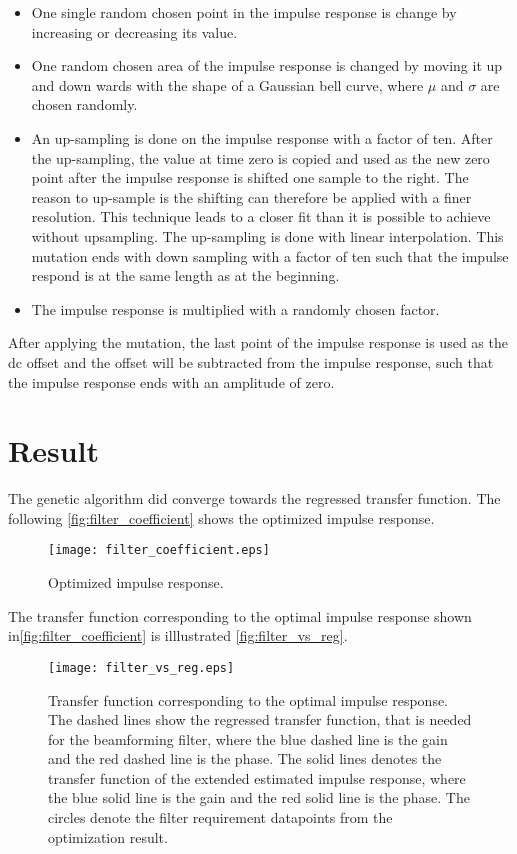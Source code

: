 \begin{itemize}
\item One single random chosen point in the impulse response is change by increasing or decreasing its value.
\item One random chosen area of the impulse response is changed by moving it up and down wards with the shape of a Gaussian bell curve, where $\mu$ and $\sigma$ are chosen randomly.
\item An up-sampling is done on the impulse response with a factor of ten. After the up-sampling, the value at time zero is copied and used as the new zero point after the impulse response is shifted one sample to the right. The reason to up-sample is the shifting can therefore be applied with a finer resolution. This technique leads to a closer fit than it is possible to achieve without upsampling. The up-sampling is done with linear interpolation. This mutation ends with down sampling with a factor of ten such that the impulse respond is at the same length as at the beginning.
\item The impulse response is multiplied with a randomly chosen factor. 
\end{itemize}

After applying the mutation, the last point of the impulse response is used as the \gls{dc} offset and the offset will be subtracted from the impulse response, such that the impulse response ends with an amplitude of zero. 

\section{Result}
The genetic algorithm did converge towards the regressed transfer function. The following \autoref{fig:filter_coefficient} shows the optimized impulse response.

 \begin{figure}[H]
	\centering
	\texttt{[image: filter\_coefficient.eps]}
	\caption{Optimized impulse response.}
		\label{fig:filter_coefficient}
\end{figure}

The transfer function corresponding to the optimal impulse response shown in\autoref{fig:filter_coefficient} is illlustrated \autoref{fig:filter_vs_reg}.

\begin{figure}[H]
	\centering
	\texttt{[image: filter\_vs\_reg.eps]}
	\caption{Transfer function corresponding to the optimal impulse response. The dashed lines show the regressed transfer function, that is needed for the beamforming filter,  where the blue dashed line is the gain and the red dashed line is the phase. The solid lines denotes the transfer function of the extended estimated impulse response, where the blue solid line is the gain and the red solid line is the phase. The circles denote the filter requirement datapoints from the optimization result.}
		\label{fig:filter_vs_reg}
\end{figure}


